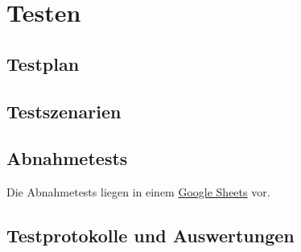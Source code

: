 \chapter{Testen}\label{ch:testen}



\section{Testplan}\label{sec:testplan}





\section{Testszenarien}\label{sec:testszenarien}



\section{Abnahmetests}\label{sec:abnahmetest}

%
Die Abnahmetests liegen in einem
\href{https://docs.google.com/spreadsheets/d/1FzOZ4AyaUKZ6hcOzm9CIS6r-4n3aabzFG-6NZyX3wJg/edit?usp=sharing}{Google Sheets}
vor.


\section{Testprotokolle und Auswertungen}\label{sec:testprotokolle-und-auswertungen}

